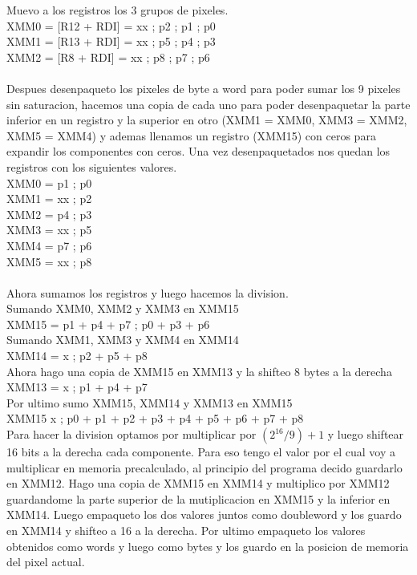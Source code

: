 Muevo a los registros los 3 grupos de pixeles. \\
	XMM0 = [R12 + RDI] = xx ; p2 ; p1 ; p0 \\
	XMM1 = [R13 + RDI] = xx ; p5 ; p4 ; p3 \\
	XMM2 = [R8  + RDI] = xx ; p8 ; p7 ; p6 \\
\\
Despues desenpaqueto los pixeles de byte a word para poder sumar los 9 pixeles sin saturacion, hacemos una copia de cada uno para poder desenpaquetar la parte inferior en un registro y la superior en otro (XMM1 = XMM0, XMM3 = XMM2, XMM5 = XMM4) y ademas llenamos un registro (XMM15) con ceros para expandir los componentes con ceros.
Una vez desenpaquetados nos quedan los registros con los siguientes valores.
\\
	XMM0 = p1 ; p0 \\
 	XMM1 = xx ; p2 \\
 	XMM2 = p4 ; p3 \\
	XMM3 = xx ; p5 \\ 
	XMM4 = p7 ; p6 \\
	XMM5 = xx ; p8 \\
\\
Ahora sumamos los registros y luego hacemos la division. \\
Sumando XMM0, XMM2 y XMM3 en XMM15 \\
	XMM15 = p1 + p4 + p7 ; p0 + p3 + p6	\\
Sumando XMM1, XMM3 y XMM4 en XMM14	\\
	XMM14 = x ; p2 + p5 + p8 \\
Ahora hago una copia de XMM15 en XMM13 y la shifteo 8 bytes a la derecha \\
	XMM13 = x ; p1 + p4 + p7 \\
Por ultimo sumo XMM15, XMM14 y XMM13 en XMM15 \\
	XMM15 x ; p0 + p1 + p2 + p3 + p4 + p5 + p6 + p7 + p8 \\

Para hacer la division optamos por multiplicar por $(2^{16} / 9) + 1$ y luego shiftear 16 bits a la derecha cada componente. Para eso tengo el valor por el cual voy a multiplicar en memoria precalculado, al principio del programa decido guardarlo en XMM12.
Hago una copia de XMM15 en XMM14 y multiplico por XMM12 guardandome la parte superior de la mutiplicacion en XMM15 y la inferior en XMM14. Luego empaqueto los dos valores juntos como doubleword y los guardo en XMM14 y shifteo a 16 a la derecha.
Por ultimo empaqueto los valores obtenidos como words y luego como bytes y los guardo en la posicion de memoria del pixel actual.

